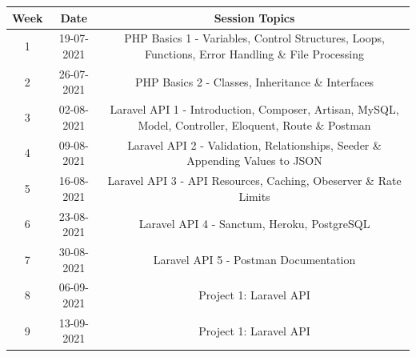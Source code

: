 \documentclass{article}
\begin{document}
\renewcommand{\arraystretch}{1.5}
\begin{tabular}{|c|c|c|c|}
	\hline
	\textbf{Week} & \textbf{Date}     & \multicolumn{2}{c|}{\textbf{Session Topics}}        \\ \hline
	\footnotesize 1      & \footnotesize 19-07-2021 & \multicolumn{2}{c|}{\footnotesize PHP Basics 1 - Variables, Control Structures, Loops, Functions, Error Handling \& File Processing} \\ \hline
	\footnotesize 2      & \footnotesize 26-07-2021 & \multicolumn{2}{c|}{\footnotesize PHP Basics 2 - Classes, Inheritance \& Interfaces} \\ \hline
	\footnotesize 3      & \footnotesize 02-08-2021 & \multicolumn{2}{c|}{\footnotesize Laravel API 1 - Introduction, Composer, Artisan, MySQL, Model, Controller, Eloquent, Route \& Postman} \\ \hline
	\footnotesize 4      & \footnotesize 09-08-2021 & \multicolumn{2}{c|}{\footnotesize Laravel API 2 - Validation, Relationships, Seeder \& Appending Values to JSON} \\ \hline
	\footnotesize 5      & \footnotesize 16-08-2021 & \multicolumn{2}{c|}{\footnotesize Laravel API 3 - API Resources, Caching, Obeserver \& Rate Limits} \\ \hline
	\footnotesize 6      & \footnotesize 23-08-2021 & \multicolumn{2}{c|}{\footnotesize Laravel API 4 - Sanctum, Heroku, PostgreSQL} \\ \hline
	\footnotesize 7      & \footnotesize 30-08-2021 & \multicolumn{2}{c|}{\footnotesize Laravel API 5 - Postman Documentation} \\ \hline
	\footnotesize 8      & \footnotesize 06-09-2021 & \multicolumn{2}{c|}{\footnotesize Project 1: Laravel API} \\ \hline
	\footnotesize 9      & \footnotesize 13-09-2021 & \multicolumn{2}{c|}{\footnotesize Project 1: Laravel API} \\ \hline


\end{tabular}
\end{document}
